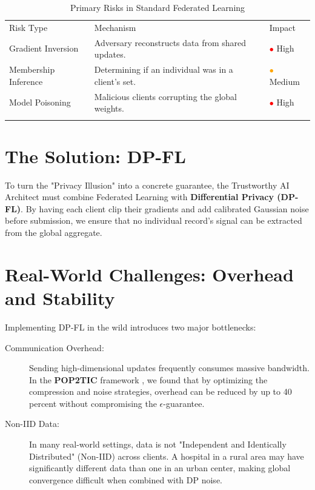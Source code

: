 \begin{table}
\caption{Primary Risks in Standard Federated Learning}
\label{tab:fl_risks}
\begin{tabular}{p{3cm}p{5cm}p{2cm}}
\hline\noalign{\smallskip}
Risk Type & Mechanism & Impact \\
\noalign{\smallskip}\svhline\noalign{\smallskip}
Gradient Inversion & Adversary reconstructs data from shared updates. & \textcolor{red}{$\bullet$} High \\
Membership Inference & Determining if an individual was in a client's set. & \textcolor{orange}{$\bullet$} Medium \\
Model Poisoning & Malicious clients corrupting the global weights. & \textcolor{red}{$\bullet$} High \\
\noalign{\smallskip}\hline\noalign{\smallskip}
\end{tabular}
\end{table}

\section{The Solution: DP-FL}
\label{sec:dp_fl}

To turn the "Privacy Illusion" into a concrete guarantee, the Trustworthy AI Architect must combine Federated Learning with \textbf{Differential Privacy (DP-FL)}. By having each client clip their gradients and add calibrated Gaussian noise before submission, we ensure that no individual record's signal can be extracted from the global aggregate.

\section{Real-World Challenges: Overhead and Stability}
\label{sec:fl_challenges}

Implementing DP-FL in the wild introduces two major bottlenecks:

\begin{description}
  \item[Communication Overhead:] 
        Sending high-dimensional updates frequently consumes massive bandwidth. In the \textbf{POP2TIC} framework \cite{science-DOI}, we found that by optimizing the compression and noise strategies, overhead can be reduced by up to 40 percent without compromising the $\epsilon$-guarantee.
  \item[Non-IID Data:]
        In many real-world settings, data is not "Independent and Identically Distributed" (Non-IID) across clients. A hospital in a rural area may have significantly different data than one in an urban center, making global convergence difficult when combined with DP noise.
\end{description}

